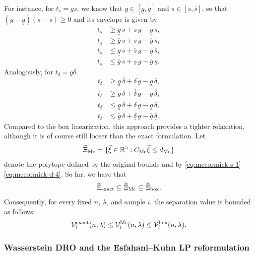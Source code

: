 \documentclass[11pt]{article}
\newcommand{\R}{\mathbb{R}}
\theoremstyle{plain}
\theoremstyle{definition}
\begin{document}
\noindent For instance, for $t_s=gs$, we know that $g\in[\underline g,\overline g]$ and $s\in[\underline s,\overline s]$, so that $(g-\underline g)(s-\underline s)\ge0$ and its envelope is given by 
\begin{align} t_s &\ge \underline g\,s+\underline s\,g-\underline g\,\underline s, \label{eq:mccormick-s-1}\\ t_s &\ge \overline g\,s+\overline s\,g-\overline g\,\overline s, \label{eq:mccormick-s-2}\\ t_s &\le \underline g\,s+\overline s\,g-\underline g\,\overline s, \label{eq:mccormick-s-3}\\ t_s &\le \overline g\,s+\underline s\,g-\overline g\,\underline s. \label{eq:mccormick-s-4} \end{align} 
Analogously, for $t_\delta=g\delta$, \begin{align} t_\delta &\ge \underline g\,\delta+\underline\delta\,g-\underline g\,\underline\delta, \label{eq:mccormick-d-1}\\ t_\delta &\ge \overline g\,\delta+\overline\delta\,g-\overline g\,\overline\delta, \label{eq:mccormick-d-2}\\ t_\delta &\le \underline g\,\delta+\overline\delta\,g-\underline g\,\overline\delta, \label{eq:mccormick-d-3}\\ t_\delta &\le \overline g\,\delta+\underline\delta\,g-\overline g\,\underline\delta. \label{eq:mccormick-d-4} \end{align} 
Compared to the box linearization, this approach provides a tighter relaxation, although it is of course still looser than the exact formulation. 
Let \[ \widetilde\Xi_{\rm Mc} = \{\widetilde\xi\in\R^5:C_{\rm Mc}\widetilde\xi\le d_{\rm Mc}\} \] denote the polytope defined by the original bounds and by \eqref{eq:mccormick-s-1}--\eqref{eq:mccormick-d-4}. 
So far, we have that \[ \widetilde\Xi_{\rm exact} \subseteq \widetilde\Xi_{\rm Mc} \subseteq \widetilde\Xi_{\rm box}. \] 
Consequently, for every fixed $n$, $\lambda$, and sample $i$, the separation value is bounded as follows: 
\[ \mathcal V_i^{\rm exact}(n,\lambda) \le \mathcal V_i^{\rm Mc}(n,\lambda) \le \mathcal V_i^{\rm box}(n,\lambda). \] 

\subsubsection{Wasserstein DRO and the Esfahani--Kuhn LP reformulation}
\label{subsubsec:ek-lp-reformulation}
\end{document}
